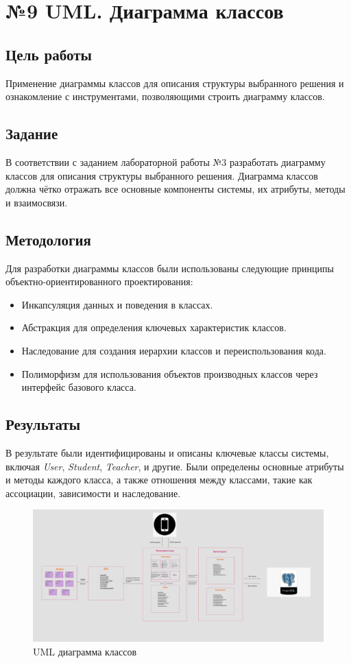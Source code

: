 \documentclass[a4paper,12pt]{article}
\begin{document}
\clearpage
\section*{№9 UML. Диаграмма классов}

\subsection{Цель работы}
Применение диаграммы классов для описания структуры выбранного решения и ознакомление с инструментами, позволяющими строить диаграмму классов.

\subsection{Задание}
В соответствии с заданием лабораторной работы №3 разработать диаграмму классов для описания структуры выбранного решения. Диаграмма классов должна чётко отражать все основные компоненты системы, их атрибуты, методы и взаимосвязи.

\subsection{Методология}
Для разработки диаграммы классов были использованы следующие принципы объектно-ориентированного проектирования:
\begin{itemize}
    \item Инкапсуляция данных и поведения в классах.
    \item Абстракция для определения ключевых характеристик классов.
    \item Наследование для создания иерархии классов и переиспользования кода.
    \item Полиморфизм для использования объектов производных классов через интерфейс базового класса.
\end{itemize}

\subsection{Результаты}
В результате были идентифицированы и описаны ключевые классы системы, включая \textit{User}, \textit{Student}, \textit{Teacher}, и другие. Были определены основные атрибуты и методы каждого класса, а также отношения между классами, такие как ассоциации, зависимости и наследование.

\begin{figure}[-h]
    \centering
    \includegraphics[width=0.5\linewidth]{UML_Class.png}
    \caption{UML диаграмма классов}
\end{figure}
\end{document}
